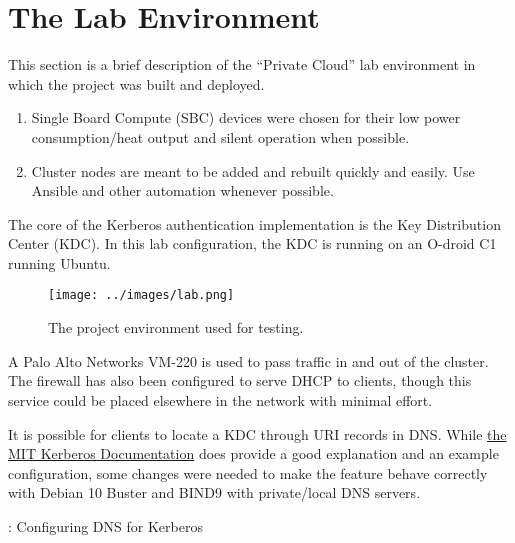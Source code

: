 \section{\label{sec:environment}The Lab Environment}
\vspace{2mm}
\justifying
This section is a brief description of the ``Private Cloud'' lab environment in which the project was built and deployed. 

\begin{raggedright}
	\begin{enumerate}
		\item Single Board Compute (SBC) devices were chosen for their low power consumption/heat output and silent operation when possible.
		\item Cluster nodes are meant to be added and rebuilt quickly and easily. Use Ansible and other automation whenever possible.
	\end{enumerate}
\end{raggedright}

\vspace{2mm}
\justifying
The core of the Kerberos authentication implementation is the Key Distribution Center (KDC). In this lab configuration, the KDC is running on
an O-droid C1 running Ubuntu.

\begin{figure}[H]
	\texttt{[image: ../images/lab.png]}
	\caption{The project environment used for testing.}
	\label{lab}
\end{figure}


\justifying
A Palo Alto Networks VM-220 is used to pass traffic in and out of the cluster. The firewall has also been configured to serve DHCP to clients,
though this service could be placed elsewhere in the network with minimal effort.

\vspace{2mm}
\vspace{2mm}

\justifying
It is possible for clients to locate a KDC through URI records in DNS. While \href{https://web.mit.edu/kerberos/www/krb5-latest/doc/admin/realm_config.html#kdc-discovery}{the MIT Kerberos Documentation}
does provide a good explanation and an example configuration, some changes were needed to make the feature behave correctly with Debian 10 Buster and BIND9 with private/local DNS servers.

\begin{mybox}{\thetcbcounter: Configuring DNS for Kerberos}
	
\end{mybox}

